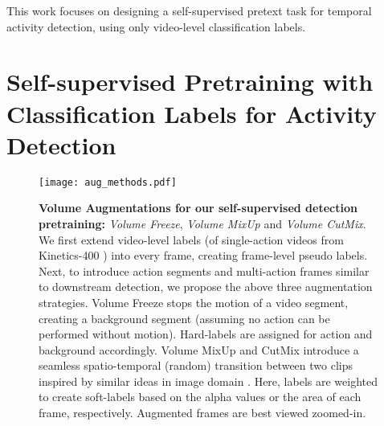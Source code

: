 \documentclass[10pt,twocolumn,letterpaper]{article}
\begin{document}
This work focuses on designing a self-supervised pretext task for temporal activity detection, using only video-level classification labels.

\vspace{-1mm}


\section{Self-supervised Pretraining with Classification Labels for Activity Detection}
\label{method}

\begin{figure*}[t]
	\centering
	\vspace{-1mm}
	\texttt{[image: aug\_methods.pdf]}
	\vspace{-1mm}
	\caption{\textbf{Volume Augmentations for our self-supervised detection pretraining:} \textit{Volume Freeze}, \textit{Volume MixUp} and \textit{Volume CutMix}. We first extend video-level labels (of single-action videos from Kinetics-400 \cite{carreira2017quo}) into every frame, creating frame-level pseudo labels. Next, to introduce action segments and multi-action frames similar to downstream detection, we propose the above three augmentation strategies. Volume Freeze stops the motion of a video segment, creating a background segment (assuming no action can be performed without motion). Hard-labels are assigned for action and background accordingly. Volume MixUp and CutMix introduce a seamless spatio-temporal (random) transition between two clips inspired by similar ideas in image domain \cite{zhang2017mixup, yun2019cutmix}. Here, labels are weighted to create soft-labels based on the alpha values or the area of each frame, respectively. Augmented frames are best viewed zoomed-in.}
	\vspace{-5mm}
	\label{fig:aug}
\end{figure*}
\end{document}
